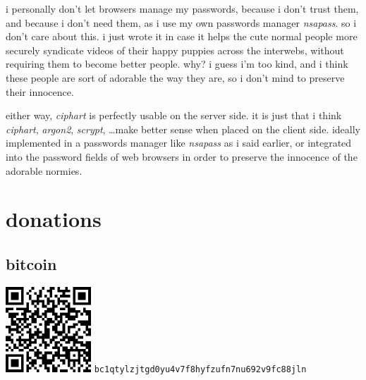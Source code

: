 \documentclass[twocolumn]{article}
\begin{document}
i personally don't let browsers manage my passwords, because i don't trust
them, and because i don't need them, as i use my own passwords manager
\emph{nsapass}.  so i don't care about this.  i just wrote it in case it
helps the cute normal people more securely syndicate videos of their happy
puppies across the interwebs, without requiring them to become better
people.  why?  i guess i'm too kind, and i think these people are sort of
adorable the way they are, so i don't mind to preserve their innocence.

either  way, \emph{ciphart} is perfectly usable on the server side.  it is
just that i think \emph{ciphart}, \emph{argon2}, \emph{scrypt}, \ldots make
better sense when placed on the client side.  ideally implemented in a
passwords manager like \emph{nsapass} as i said earlier, or integrated into
the password fields of web browsers in order to preserve the innocence of
the adorable normies.

\vfill
\break
\appendix
\section{donations}
\subsection{bitcoin}
\begin{center}
    \includegraphics[width=121px]{./pics/btc_wallet_address_trimmed.png}
    \texttt{bc1qtylzjtgd0yu4v7f8hyfzufn7nu692v9fc88jln}
\end{center}
\end{document}
